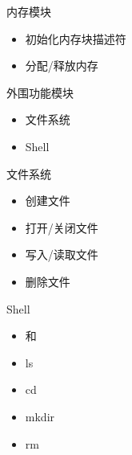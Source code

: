 \documentclass{swfubeamer}
\newcommand\Ctrl[1]{\LKeyCtrlX{#1}} %
\begin{document}
\begin{frame}{内存模块}
  \begin{itemize}
  \item 初始化内存块描述符
  \item 分配/释放内存
  \end{itemize}
\end{frame}

\begin{frame}{外围功能模块}
  \begin{itemize}
  \item 文件系统
  \item Shell
  \end{itemize}
\end{frame}

\begin{frame}{文件系统}
  \begin{itemize}
  \item 创建文件
  \item 打开/关闭文件
  \item 写入/读取文件
  \item 删除文件
  \end{itemize}
\end{frame}

\begin{frame}{Shell}
  \begin{itemize}
  \item \Ctrl{L} 和 \Ctrl{U}
  \item ls
  \item cd
  \item mkdir
  \item rm
  \end{itemize}
\end{frame}
\end{document}
